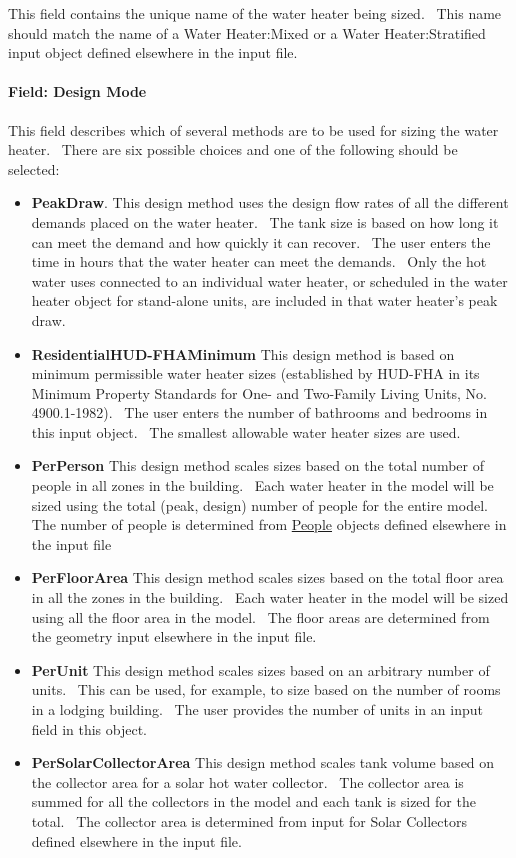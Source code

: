 This field contains the unique name of the water heater being sized.~ This name should match the name of a Water Heater:Mixed or a Water Heater:Stratified input object defined elsewhere in the input file.

\paragraph{Field: Design Mode}\label{field-design-mode}

This field describes which of several methods are to be used for sizing the water heater.~ There are six possible choices and one of the following should be selected:

\begin{itemize}
\item
  \textbf{PeakDraw}. This design method uses the design flow rates of all the different demands placed on the water heater.~ The tank size is based on how long it can meet the demand and how quickly it can recover.~ The user enters the time in hours that the water heater can meet the demands.~ Only the hot water uses connected to an individual water heater, or scheduled in the water heater object for stand-alone units, are included in that water heater's peak draw.
\item
  \textbf{ResidentialHUD-FHAMinimum} This design method is based on minimum permissible water heater sizes (established by HUD-FHA in its Minimum Property Standards for One- and Two-Family Living Units, No. 4900.1-1982).~ The user enters the number of bathrooms and bedrooms in this input object.~ The smallest allowable water heater sizes are used.
\item
  \textbf{PerPerson} This design method scales sizes based on the total number of people in all zones in the building.~ Each water heater in the model will be sized using the total (peak, design) number of people for the entire model.~ The number of people is determined from \hyperref[people]{People} objects defined elsewhere in the input file
\item
  \textbf{PerFloorArea} This design method scales sizes based on the total floor area in all the zones in the building.~ Each water heater in the model will be sized using all the floor area in the model.~ The floor areas are determined from the geometry input elsewhere in the input file.
\item
  \textbf{PerUnit} This design method scales sizes based on an arbitrary number of units.~ This can be used, for example, to size based on the number of rooms in a lodging building.~ The user provides the number of units in an input field in this object.
\item
  \textbf{PerSolarCollectorArea} This design method scales tank volume based on the collector area for a solar hot water collector.~ The collector area is summed for all the collectors in the model and each tank is sized for the total.~ The collector area is determined from input for Solar Collectors defined elsewhere in the input file.
\end{itemize}

